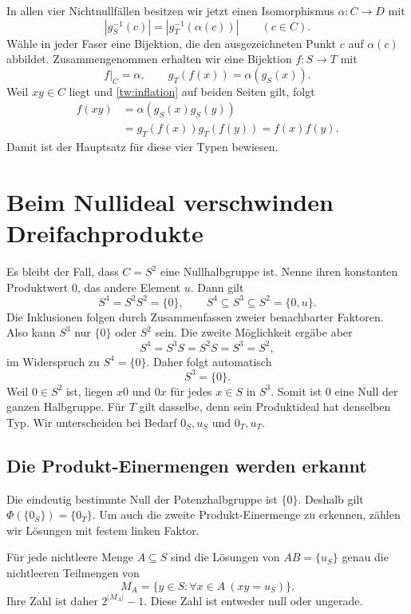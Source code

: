 \documentclass[a4paper,11pt]{article}
\begin{document}
In allen vier Nichtnullfällen besitzen wir jetzt einen Isomorphismus
\(\alpha:C\to D\) mit
\[
 |g_S^{-1}(c)|=|g_T^{-1}(\alpha(c))|\qquad(c\in C).
\]
Wähle in jeder Faser eine Bijektion, die den ausgezeichneten Punkt
\(c\) auf \(\alpha(c)\) abbildet. Zusammengenommen erhalten wir
eine Bijektion \(f:S\to T\) mit
\[
 f|_C=\alpha,\qquad g_T(f(x))=\alpha(g_S(x)).
\]
Weil \(xy\in C\) liegt und \eqref{tw:inflation} auf beiden Seiten
gilt, folgt
\[
 \begin{aligned}
 f(xy)&=\alpha(g_S(x)g_S(y))\\
      &=g_T(f(x))g_T(f(y))=f(x)f(y).
 \end{aligned}
\]
Damit ist der Hauptsatz für diese vier Typen bewiesen.

\section{Beim Nullideal verschwinden Dreifachprodukte}

Es bleibt der Fall, dass \(C=S^2\) eine Nullhalbgruppe ist. Nenne
ihren konstanten Produktwert \(0\), das andere Element \(u\).
Dann gilt
\[
 S^4=S^2S^2=\{0\},\qquad S^4\subseteq S^3\subseteq S^2=\{0,u\}.
\]
Die Inklusionen folgen durch Zusammenfassen zweier benachbarter
Faktoren. Also kann \(S^3\) nur \(\{0\}\) oder \(S^2\) sein.
Die zweite Möglichkeit ergäbe aber
\[
 S^4=S^3S=S^2S=S^3=S^2,
\]
im Widerspruch zu \(S^4=\{0\}\). Daher folgt automatisch
\begin{equation}\label{tw:nilpotent}
 S^3=\{0\}.
\end{equation}
Weil \(0\in S^2\) ist, liegen \(x0\) und \(0x\) für jedes
\(x\in S\) in \(S^3\). Somit ist \(0\) eine Null der ganzen
Halbgruppe. Für \(T\) gilt dasselbe, denn sein Produktideal hat
denselben Typ. Wir unterscheiden bei Bedarf \(0_S,u_S\) und
\(0_T,u_T\).

\subsection{Die Produkt-Einermengen werden erkannt}

Die eindeutig bestimmte Null der Potenzhalbgruppe ist \(\{0\}\).
Deshalb gilt \(\Phi(\{0_S\})=\{0_T\}\). Um auch die zweite
Produkt-Einermenge zu erkennen, zählen wir Lösungen mit festem linken
Faktor.

Für jede nichtleere Menge \(A\subseteq S\) sind die Lösungen von
\(AB=\{u_S\}\) genau die nichtleeren Teilmengen von
\[
 M_A=\{y\in S:\forall x\in A\ (xy=u_S)\}.
\]
Ihre Zahl ist daher \(2^{|M_A|}-1\). Diese Zahl ist entweder null
oder ungerade.
\end{document}
